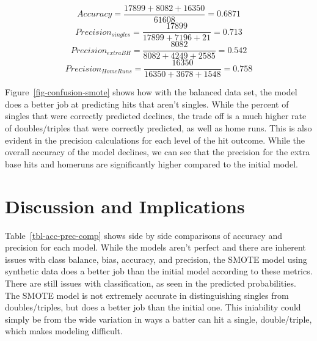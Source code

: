 \documentclass[
  letterpaper,
  DIV=11,
  numbers=noendperiod]{scrartcl}
\begin{document}
\[ Accuracy = \frac{17899 + 8082 + 16350}{61608} = 0.6871\]
\[Precision_{singles} = \frac{17899}{17899 + 7196 + 21} = 0.713\]
\[Precision_{extraBH} = \frac{8082}{8082 + 4249 + 2585} = 0.542\]
\[Precision_{HomeRuns} = \frac{16350}{16350 + 3678 + 1548} = 0.758\]

Figure~\ref{fig-confusion-smote} shows how with the balanced data set,
the model does a better job at predicting hits that aren't singles.
While the percent of singles that were correctly predicted declines, the
trade off is a much higher rate of doubles/triples that were correctly
predicted, as well as home runs. This is also evident in the precision
calculations for each level of the hit outcome. While the overall
accuracy of the model declines, we can see that the precision for the
extra base hits and homeruns are significantly higher compared to the
initial model.

\section{Discussion and Implications}\label{discussion-and-implications}

\begin{table}

\caption{\label{tbl-acc-prec-comp}Accuracy and Precision Comparison}


\end{table}%

Table~\ref{tbl-acc-prec-comp} shows side by side comparisons of accuracy
and precision for each model. While the models aren't perfect and there
are inherent issues with class balance, bias, accuracy, and precision,
the SMOTE model using synthetic data does a better job than the initial
model according to these metrics. There are still issues with
classification, as seen in the predicted probabilities. The SMOTE model
is not extremely accurate in distinguishing singles from
doubles/triples, but does a better job than the initial one. This
iniability could simply be from the wide variation in ways a batter can
hit a single, double/triple, which makes modeling difficult.
\end{document}
